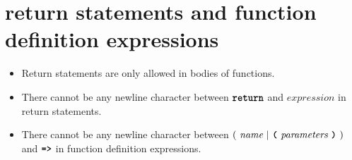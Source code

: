\section*{\textrm{return} statements and function definition expressions}

\begin{itemize}
\item Return statements are only allowed in bodies of functions.
\item There cannot be any newline character between
$\textbf{\texttt{return}}$ and $\textit{expression}$ in return statements.
\item There cannot be any newline character between
  $(\ \textit{name}\ | \ \textbf{\texttt{(}}\ \textit{parameters}\ \textbf{\texttt{)}}\ )$
                                               and
$\texttt{\textbf{=>}}$ in function definition expressions.
                                               
\end{itemize}

